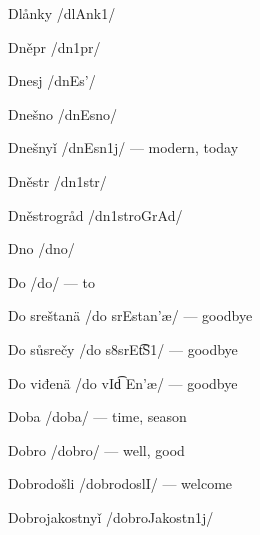 Dlånky /dlAnk1/

Dněpr /dn1pr/

Dnesj /dnEs’/

Dnešno /dnE\:sno/

Dnešnyǐ /dnE\:sn1j/ — modern, today

Dněstr /dn1str/

Dněstrogråd /dn1stroGrAd/

Dno /dno/

Do /do/ — to

Do sreštanä /do srE\:stan’æ/ — goodbye

Do sůsrečy /do s8srE\t{tS}1/ — goodbye

Do viđenä /do vI\t{d \textctz}En’æ/ — goodbye

Doba /doba/ — time, season

Dobro /dobro/ — well, good

Dobrodošli /dobrodo\:slI/ — welcome

Dobrojakostnyǐ /dobroJakostn1j/

